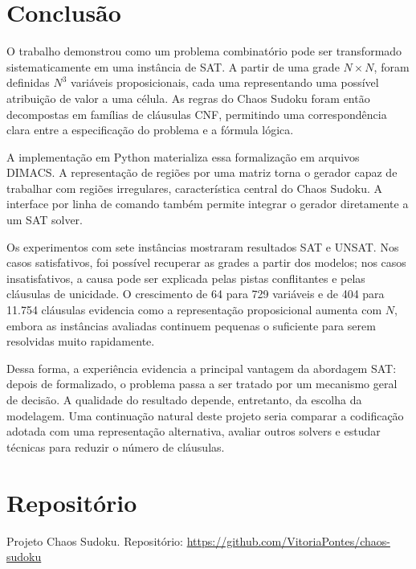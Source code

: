 \documentclass[a4paper, 12pt]{article}
\begin{document}
\section{Conclusão}

O trabalho demonstrou como um problema combinatório pode ser transformado sistematicamente em uma instância de SAT. A partir de uma grade \(N \times N\), foram definidas \(N^3\) variáveis proposicionais, cada uma representando uma possível atribuição de valor a uma célula. As regras do Chaos Sudoku foram então decompostas em famílias de cláusulas CNF, permitindo uma correspondência clara entre a especificação do problema e a fórmula lógica.

A implementação em Python materializa essa formalização em arquivos DIMACS. A representação de regiões por uma matriz torna o gerador capaz de trabalhar com regiões irregulares, característica central do Chaos Sudoku. A interface por linha de comando também permite integrar o gerador diretamente a um SAT solver.

Os experimentos com sete instâncias mostraram resultados SAT e UNSAT. Nos casos satisfativos, foi possível recuperar as grades a partir dos modelos; nos casos insatisfativos, a causa pode ser explicada pelas pistas conflitantes e pelas cláusulas de unicidade. O crescimento de 64 para 729 variáveis e de 404 para 11.754 cláusulas evidencia como a representação proposicional aumenta com \(N\), embora as instâncias avaliadas continuem pequenas o suficiente para serem resolvidas muito rapidamente.

Dessa forma, a experiência evidencia a principal vantagem da abordagem SAT: depois de formalizado, o problema passa a ser tratado por um mecanismo geral de decisão. A qualidade do resultado depende, entretanto, da escolha da modelagem. Uma continuação natural deste projeto seria comparar a codificação adotada com uma representação alternativa, avaliar outros solvers e estudar técnicas para reduzir o número de cláusulas.

\section{Repositório}

Projeto Chaos Sudoku. Repositório: \url{https://github.com/VitoriaPontes/chaos-sudoku}
\end{document}
